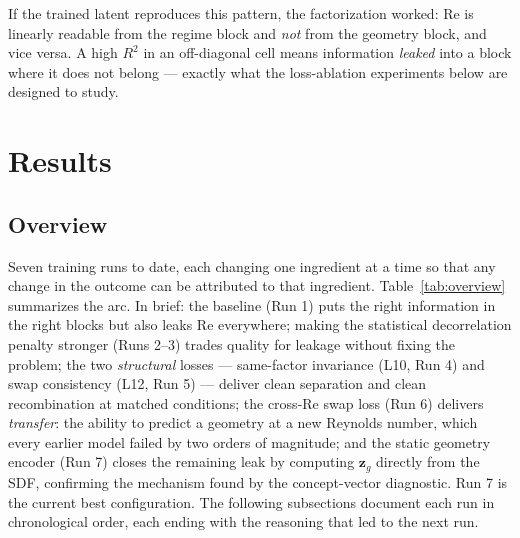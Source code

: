 \documentclass[11pt]{article}
\begin{document}
If the trained latent reproduces this pattern, the factorization worked:
Re is linearly readable from the regime block and \emph{not} from the
geometry block, and vice versa. A high $R^2$ in an off-diagonal cell
means information \emph{leaked} into a block where it does not belong ---
exactly what the loss-ablation experiments below are designed to study.

\section{Results}

\subsection{Overview}

Seven training runs to date, each changing one ingredient at a time so
that any change in the outcome can be attributed to that ingredient.
Table~\ref{tab:overview} summarizes the arc. In brief: the baseline
(Run 1) puts the right information in the right blocks but also leaks Re
everywhere; making the statistical decorrelation penalty stronger (Runs
2--3) trades quality for leakage without fixing the problem; the two
\emph{structural} losses --- same-factor invariance (L10, Run 4) and swap
consistency (L12, Run 5) --- deliver clean separation and clean
recombination at matched conditions; the cross-Re swap loss (Run 6)
delivers \emph{transfer}: the ability to predict a geometry at a new
Reynolds number, which every earlier model failed by two orders of
magnitude; and the static geometry encoder (Run 7) closes the remaining
leak by computing $\boldsymbol{z}_{g}$ directly from the SDF, confirming
the mechanism found by the concept-vector diagnostic. Run 7 is the
current best configuration. The following subsections document each run
in chronological order, each ending with the reasoning that led to the
next run.
\end{document}
